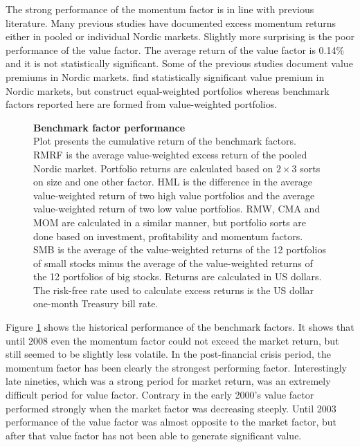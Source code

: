 \documentclass[12pt]{article}
\begin{document}
The strong performance of the momentum factor is in line with previous literature. Many previous studies have documented excess momentum returns either in pooled or individual Nordic markets.\footnotemark {} Slightly more surprising is the poor performance of the value factor. The average return of the value factor is 0.14\% and it is not statistically significant. Some of the previous studies document value premiums in Nordic markets. \citet{grobys} find statistically significant value premium in Nordic markets, but \citeauthor{grobys} construct equal-weighted portfolios whereas benchmark factors reported here are formed from value-weighted portfolios.\footnotemark {} \par

\begin{figure}[ht]
\centering
\caption[Benchmark factor performance]{\textbf{Benchmark factor performance}\\ Plot presents the cumulative return of the benchmark factors. RMRF is the average value-weighted excess return of the pooled Nordic market. Portfolio returns are calculated based on $2 \times 3$ sorts on size and one other factor. HML is the difference in the average value-weighted return of two high value portfolios and the average value-weighted return of two low value portfolios. RMW, CMA and MOM are calculated in a similar manner, but portfolio sorts are done based on investment, profitability and momentum factors. SMB is the average of the value-weighted returns of the 12 portfolios of small stocks minus the average of the value-weighted returns of the 12 portfolios of big stocks. Returns are calculated in US dollars. The risk-free rate used to calculate excess returns is the US dollar one-month Treasury bill rate.}

\label{plot:factor_performance}
\end{figure}

Figure \ref{plot:factor_performance} shows the historical performance of the benchmark factors. It shows that until 2008 even the momentum factor could not exceed the market return, but still seemed to be slightly less volatile. In the post-financial crisis period, the momentum factor has been clearly the strongest performing factor. Interestingly late nineties, which was a strong period for market return, was an extremely difficult period for value factor. Contrary in the early 2000's value factor performed strongly when the market factor was decreasing steeply. Until 2003 performance of the value factor was almost opposite to the market factor, but after that value factor has not been able to generate significant value. \par
\end{document}
